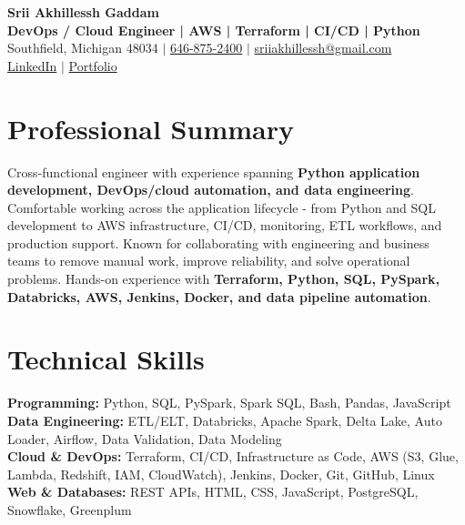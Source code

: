 \documentclass[letterpaper,10pt]{article}
\begin{document}
\fontsize{9.35pt}{10.45pt}\selectfont

\begin{center}
    {\LARGE \textbf{Srii Akhillessh Gaddam}} \\[-1pt]
    \textbf{DevOps / Cloud Engineer | AWS | Terraform | CI/CD | Python} \\[2pt]
    Southfield, Michigan 48034 $|$
    \href{tel:6468752400}{646-875-2400} $|$
    \href{mailto:sriiakhillessh@gmail.com}{sriiakhillessh@gmail.com} \\[1pt]
    \href{https://www.linkedin.com/in/srii-akhiilessh-gaddam-b48668191/}{LinkedIn} $|$
    \href{https://sriiakhillesshg.github.io/portfolio/}{Portfolio}
\end{center}
\vspace{-8pt}

\section{Professional Summary}
\small{Cross-functional engineer with experience spanning \textbf{Python application development, DevOps/cloud automation, and data engineering}. Comfortable working across the application lifecycle - from Python and SQL development to AWS infrastructure, CI/CD, monitoring, ETL workflows, and production support. Known for collaborating with engineering and business teams to remove manual work, improve reliability, and solve operational problems. Hands-on experience with \textbf{Terraform, Python, SQL, PySpark, Databricks, AWS, Jenkins, Docker, and data pipeline automation}.}

\section{Technical Skills}
\small{
\textbf{Programming:} Python, SQL, PySpark, Spark SQL, Bash, Pandas, JavaScript \\
\textbf{Data Engineering:} ETL/ELT, Databricks, Apache Spark, Delta Lake, Auto Loader, Airflow, Data Validation, Data Modeling \\
\textbf{Cloud \& DevOps:} Terraform, CI/CD, Infrastructure as Code, AWS (S3, Glue, Lambda, Redshift, IAM, CloudWatch), Jenkins, Docker, Git, GitHub, Linux \\
\textbf{Web \& Databases:} REST APIs, HTML, CSS, JavaScript, PostgreSQL, Snowflake, Greenplum
}
\end{document}
